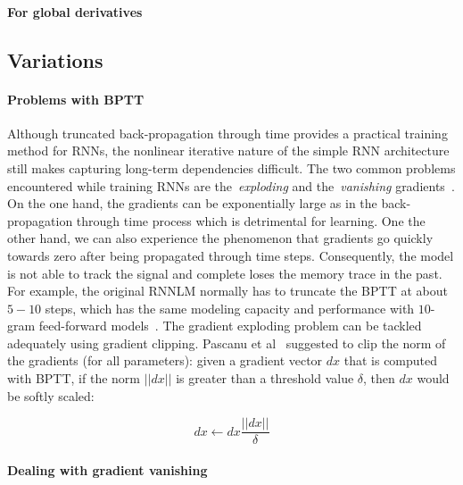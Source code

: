 \paragraph{For global derivatives}


\subsection{Variations}



\paragraph{Problems with BPTT}

Although truncated back-propagation through time provides a practical training method for RNNs, the nonlinear iterative nature of the simple RNN architecture still makes capturing long-term dependencies difficult. The two common problems encountered while training RNNs are the~\textit{exploding} and the~\textit{vanishing} gradients~\cite{bengio1994learning,pascanu2013difficulty}. On the one hand, the gradients can be exponentially large as in the back-propagation through time process which is detrimental for learning. One the other hand, we can also experience the phenomenon that gradients go quickly towards zero after being propagated through time steps. Consequently, the model is not able to track the signal and complete loses the memory trace in the past. For example, the original RNNLM normally has to truncate the BPTT at about $5-10$ steps, which has the same modeling capacity and performance with $10$-gram feed-forward models~\cite{mikolov2011extensions,hai2012measuring}. The gradient exploding problem can be tackled adequately using gradient clipping. Pascanu et al~\cite{pascanu2013difficulty} suggested to clip the norm of the gradients (for all parameters): given a gradient vector $dx$ that is computed with BPTT, if the norm $||dx||$ is greater than a threshold value $\delta$, then $dx$ would be softly scaled:

\begin{equation}
dx \leftarrow dx\frac{||dx||}{\delta}
\end{equation}

\paragraph{Dealing with gradient vanishing}

